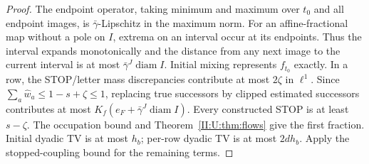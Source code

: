 \begin{proof}
The endpoint operator, taking minimum and maximum over $t_0$ and
all endpoint images, is $\bar\gamma$-Lipschitz in the maximum norm.
For an affine-fractional map without a pole on $I$, extrema on an
interval occur at its endpoints. Thus the interval expands monotonically and the
distance from any next image to the current interval is at most
$\bar\gamma^J\operatorname{diam}I$.
Initial mixing represents $f_{t_0}$ exactly. In a row, the STOP/letter
mass discrepancies contribute at most $2\zeta$ in $\ell^1$.
Since $\sum_a\widehat w_a\le1-s+\zeta\le1$, replacing true successors
by clipped estimated successors contributes at most
$K_f(e_F+\bar\gamma^J\operatorname{diam}I)$.
Every constructed STOP is at least $s-\zeta$. The occupation bound
and Theorem~\ref{II:U:thm:flows} give the first fraction. Initial dyadic TV
is at most $h_b$; per-row dyadic TV is at most $2dh_b$.
Apply the stopped-coupling bound for the remaining terms.
\end{proof}
